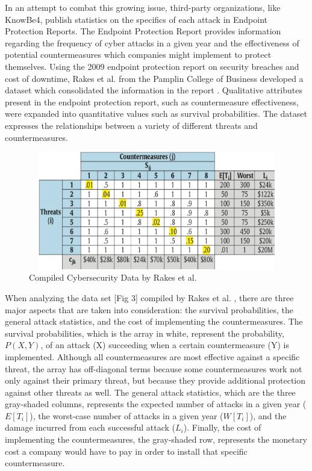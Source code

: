 \subsection*{\color{SubSectionBlue}{Endpoint Protection Data}}
 \\

In an attempt to combat this growing issue, third-party organizations, like KnowBe4, publish statistics on the specifics of each attack in Endpoint Protection Reports. The Endpoint Protection Report provides information regarding the frequency of cyber attacks in a given year and the effectiveness of potential countermeasures which companies might implement to protect themselves. Using the 2009 endpoint protection report on security breaches and cost of downtime, Rakes et al. \cite{rakes_it_2012} from the Pamplin College of Business developed a dataset which consolidated the information in the report \cite{rakes_it_2012}. Qualitative attributes present in the endpoint protection report, such as countermeasure effectiveness, were expanded into quantitative values such as survival probabilities. The dataset expresses the relationships between a variety of different threats and countermeasures.

\begin{figure}[ht]%
\centering
\includegraphics[width=15cm,height=5.15cm]{Images/protection-data.png}
\caption{Compiled Cybersecurity Data by Rakes et al. \cite{rakes_it_2012}}%
\end{figure}

When analyzing the data set [Fig 3] compiled by Rakes et al. \cite{rakes_it_2012}, there are three major aspects that are taken into consideration: the survival probabilities, the general attack statistics, and the cost of implementing the countermeasures. The survival probabilities, which is the array in white, represent the probability, $P(X, Y)$, of an attack (X) succeeding when a certain countermeasure (Y) is implemented. Although all countermeasures are most effective against a specific threat, the array has off-diagonal terms because some countermeasures work not only against their primary threat, but because they provide additional protection against other threats as well. The general attack statistics, which are the three gray-shaded columns, represents the expected number of attacks in a given year ($E[T_i]$), the worst-case number of attacks in a given year ($W[T_i]$), and the damage incurred from each successful attack ($L_i$). Finally, the cost of implementing the countermeasures, the gray-shaded row, represents the monetary cost a company would have to pay in order to install that specific countermeasure. 

